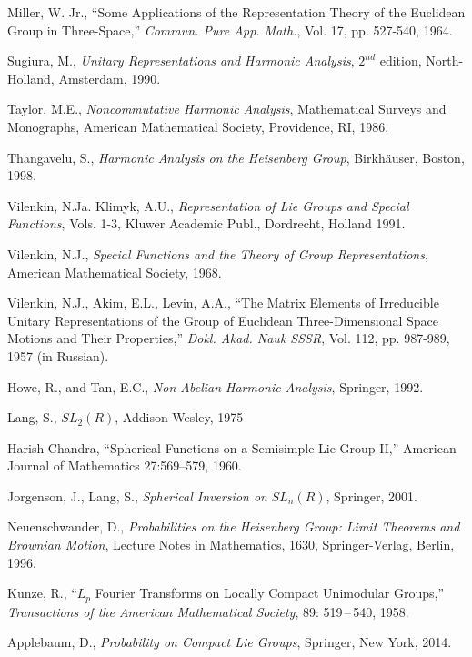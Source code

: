 \documentclass{svmult}
\newcommand{\authgloss}{\index}
\begin{document}
\begin{thebibliography}{99}
Miller, W. Jr., ``Some Applications of the Representation
 Theory of the Euclidean Group in Three-Space,''
{\it Commun. Pure App. Math.},
Vol. {17}, pp. 527-540, 1964.

Sugiura, M., {\it Unitary Representations and Harmonic Analysis},
$2^{nd}$ edition, North-Holland, Amsterdam, 1990.

Taylor, M.E., {\it Noncommutative Harmonic Analysis},
Mathematical Surveys and Monographs, American Mathematical
Society, Providence, RI, 1986.

Thangavelu, S., {\it Harmonic Analysis on the Heisenberg
Group}, Birkh\"{a}user, Boston, 1998.

Vilenkin, N.Ja. Klimyk, A.U.,
{\it Representation of Lie Groups and Special Functions},
Vols. 1-3, Kluwer Academic Publ., Dordrecht, Holland 1991.

Vilenkin, N.J., {\it Special Functions and the Theory of Group Representations}, American Mathematical Society, 1968.

 \authgloss{Akim, E.L.} \authgloss{Levin, A.A.}
Vilenkin, N.J., Akim, E.L., Levin, A.A.,
``The Matrix Elements of Irreducible Unitary Representations of the
Group of Euclidean Three-Dimensional Space Motions and Their Properties,''  {\it Dokl. Akad. Nauk SSSR}, Vol. {112}, pp. 987-989, 1957 (in Russian).

Howe, R., and Tan, E.C., {\it Non-Abelian Harmonic Analysis}, Springer, 1992.

Lang, S., $SL_2(R)$, Addison-Wesley, 1975 %

Harish Chandra, ``Spherical Functions on a Semisimple Lie Group II,''
 American Journal of Mathematics 27:569--579, 1960.

Jorgenson, J., Lang, S.,  {\it Spherical Inversion on} $SL_n(R)$, Springer, 2001.

 \authgloss{Neuenschwander, D.}
Neuenschwander, D., {\it Probabilities on the Heisenberg Group:
Limit Theorems and Brownian Motion}, Lecture Notes in Mathematics,
1630, Springer-Verlag, Berlin, 1996.


Kunze, R.,
``$L_p$ Fourier Transforms on Locally Compact Unimodular Groups,''
{\it Transactions of the American Mathematical Society},
89: 519\,--\,540, 1958.

Applebaum, D., {\it Probability on Compact Lie Groups}, Springer, New York, 2014.


\end{thebibliography}
\end{document}
